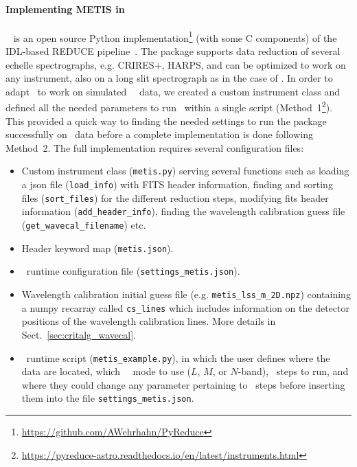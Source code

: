 \paragraph{Implementing METIS in \pyred}\label{sec:pyred_mic}
\pyred~\cite{pis21} is an  open source Python implementation\footnote{\url{https://github.com/AWehrhahn/PyReduce}} (with some C components)  of the IDL-based REDUCE pipeline~\cite{pis02}.  The package supports data reduction of several echelle spectrographs, e.g. CRIRES+,  HARPS, and can be optimized to work on any instrument, also on a  long slit spectrograph as in the case of \met. In order to adapt \pyred~to work on simulated \met~\lss~data, we created a custom instrument class  and defined all the needed parameters to run \pyred~within a single script (Method~1\footnote{\url{https://pyreduce-astro.readthedocs.io/en/latest/instruments.html}}). This provided a quick way to finding the needed settings to  run the package successfully on \met~data before a complete implementation is done following Method~2. The full implementation requires several configuration files: 
\begin{itemize}
\item Custom instrument class (\texttt{metis.py}) serving several functions such as loading a json file (\texttt{load\_info}) with FITS header information, finding  and sorting files (\texttt{sort\_files}) for the different reduction steps, modifying fits header information (\texttt{add\_header\_info}), finding the wavelength calibration guess file (\texttt{get\_wavecal\_filename}) etc.
\item Header keyword map (\texttt{metis.json}).
\item \pyred~runtime configuration file (\texttt{settings\_metis.json}). 
\item Wavelength calibration initial guess  file (e.g. \texttt{metis\_lss\_m\_2D.npz}) containing a numpy recarray called \texttt{cs\_lines} which includes information on the detector positions of the wavelength calibration lines.
 More details in Sect.~\ref{sec:critalg_wavecal}.
\item \pyred~runtime script (\texttt{metis\_example.py}), in which the user defines where the data are located, which \met~\lss~mode to use ($L$, $M$, or $N$-band), \pyred~steps to run, and where they could change any parameter pertaining to \pyred~steps before inserting them into the file \texttt{settings\_metis.json}.
\end{itemize}

